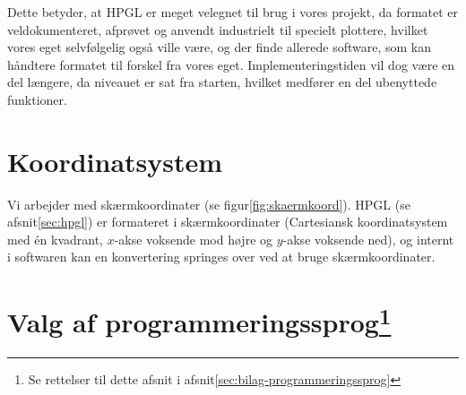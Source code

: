 Dette betyder, at HPGL er meget velegnet til brug i vores projekt, da
formatet er veldokumenteret, afprøvet og anvendt industrielt til
specielt plottere, hvilket vores eget selvfølgelig også ville være, og
der finde allerede software, som kan håndtere formatet til forskel fra
vores eget. Implementeringstiden vil dog være en del længere, da
niveauet er sat fra starten, hvilket medfører en del ubenyttede
funktioner.


\section{Koordinatsystem}


Vi arbejder med skærmkoordinater (se
figur\vref{fig:skaermkoord}). HPGL (se afsnit\vref{sec:hpgl}) er
formateret i skærmkoordinater (Cartesiansk koordinatsystem med én
kvadrant, $x$-akse voksende mod højre og $y$-akse
voksende ned), og internt i softwaren kan en konvertering springes
over ved at bruge skærmkoordinater.


\section[Valg af programmeringssprog]{Valg af
  programmeringssprog\footnote{Se rettelser til dette afsnit i afsnit\vref{sec:bilag-programmeringssprog}}}

